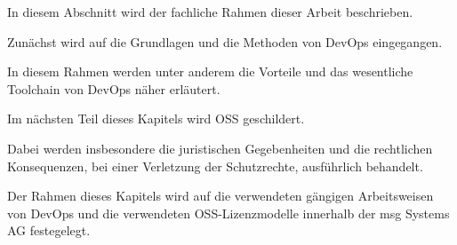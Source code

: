In diesem Abschnitt wird der fachliche Rahmen dieser Arbeit beschrieben. 

Zunächst wird  auf die Grundlagen und die Methoden von DevOps eingegangen. 

In diesem Rahmen werden unter anderem die Vorteile und das wesentliche Toolchain von DevOps näher erläutert.  

Im nächsten Teil dieses Kapitels wird OSS geschildert. 

Dabei werden insbesondere die juristischen Gegebenheiten und die rechtlichen Konsequenzen, bei einer Verletzung der Schutzrechte, ausführlich behandelt. 

Der Rahmen dieses Kapitels wird auf die verwendeten gängigen Arbeitsweisen von DevOps und die verwendeten OSS-Lizenzmodelle innerhalb der msg Systems AG festegelegt. 